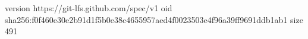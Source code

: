 version https://git-lfs.github.com/spec/v1
oid sha256:f0f460e30e2b91d1f5b0e38c4655957aed4f0023503e4f96a39ff9691ddb1ab1
size 491
